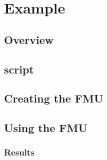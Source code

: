\chapter{Example}

\section{Overview}

\section{\matlab script}

\section{Creating the FMU}

\section{Using the FMU}

\subsection{Results}
